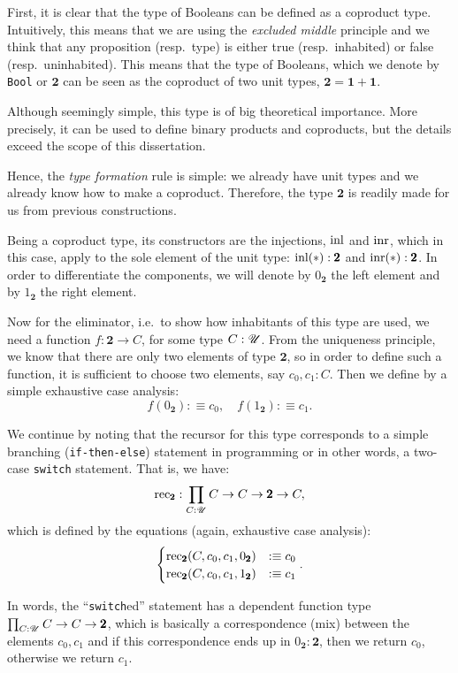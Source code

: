 First, it is clear that the type of Booleans can be defined as a coproduct
type. Intuitively, this means that we are using the \emph{excluded middle}
principle and we think that any proposition (resp.\ type) is either true
(resp.\ inhabited) or false (resp.\ uninhabited). This means that the type
of Booleans, which we denote by \texttt{Bool} or $ \pmb{2} $ can be seen as
the coproduct of two unit types, $ \pmb{2} = \pmb{1} + \pmb{1} $.

Although seemingly simple, this type is of big theoretical importance. More
precisely, it can be used to define binary products and coproducts, but the
details exceed the scope of this dissertation.

Hence, the \emph{type formation} rule is simple: we already have unit types
and we already know how to make a coproduct. Therefore, the type $ \pmb{2} $
is readily made for us from previous constructions.

Being a coproduct type, its constructors are the injections, $ \mathrm{inl} $
and $ \mathrm{inr} $, which in this case, apply to the sole element of the
unit type: $ \mathrm{inl}(\ast) : \pmb{2} $ and $ \mathrm{inr}(\ast) : \pmb{2} $.
In order to differentiate the components, we will denote by $ 0_{\pmb{2}} $
the left element and by $ 1_{\pmb{2}} $ the right element.

Now for the eliminator, i.e.\ to show how inhabitants of this type are
used, we need a function $ f : \pmb{2} \to C $, for some type $ C : \mathscr{U} $.
From the uniqueness principle, we know that there are only two elements of
type $ \pmb{2} $, so in order to define such a function, it is sufficient to
choose two elements, say $ c_0, c_1 : C $. Then we define by a simple exhaustive
case analysis:
\[
  f(0_{\pmb{2}}) :\equiv c_0, \quad f(1_{\pmb{2}}) :\equiv c_1.
\]

We continue by noting that the recursor for this type corresponds to a
simple branching (\texttt{if-then-else}) statement in programming or in
other words, a two-case \texttt{switch} statement. That is, we have:
\[
  \mathrm{rec}_{\pmb{2}} : \prod_{C : \mathscr{U}} C \to C \to \pmb{2} \to C,
\]
which is defined by the equations (again, exhaustive case analysis):
\[
  \begin{cases}
    \mathrm{rec}_{\pmb{2}}(C, c_0, c_1, 0_{\pmb{2}}) &:\equiv c_0 \\
    \mathrm{rec}_{\pmb{2}}(C, c_0, c_1, 1_{\pmb{2}}) &:\equiv c_1
  \end{cases}.
\]

In words, the ``\texttt{switch}ed'' statement has a dependent function
type $ \prod_{C : \mathscr{U}} C \to C \to \pmb{2} $, which is basically
a correspondence (mix) between the elements $ c_0, c_1 $ and if this
correspondence ends up in $ 0_{\pmb{2}} : \pmb{2} $, then we return $ c_0 $,
otherwise we return $ c_1 $.

